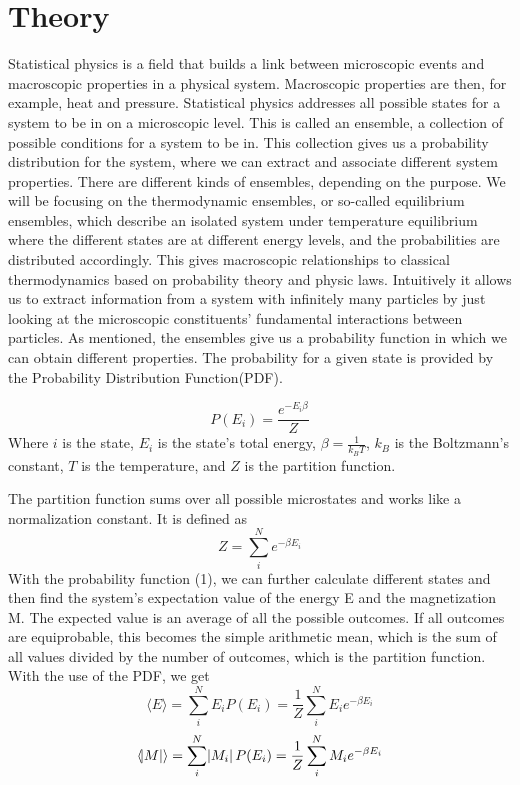 \documentclass{article}
\begin{document}
\newpage
\section{Theory}

Statistical physics is a field that builds a link between microscopic events and macroscopic properties in a physical system. Macroscopic properties are then, for example, heat and pressure.  Statistical physics addresses all possible states for a system to be in on a microscopic level. This is called an ensemble, a collection of possible conditions for a system to be in. This collection gives us a probability distribution for the system, where we can extract and associate different system properties. There are different kinds of ensembles, depending on the purpose.  We will be focusing on the thermodynamic ensembles, or so-called equilibrium ensembles, which describe an isolated system under temperature equilibrium where the different states are at different energy levels, and the probabilities are distributed accordingly. \newline
This gives macroscopic relationships to classical thermodynamics based on probability theory and physic laws. Intuitively it allows us to extract information from a system with infinitely many particles by just looking at the microscopic constituents' fundamental interactions between particles.  As mentioned, the ensembles give us a probability function in which we can obtain different properties. The probability for a given state is provided by the Probability Distribution Function(PDF).

\begin{equation}
    P(E_{i}) = \frac{e^{-E_i\beta}}{Z}
\end{equation}
Where $i$ is the state, $E_i$ is the state's total energy, $\beta=\frac{1}{k_BT}$, $k_B$ is the Boltzmann's constant, $T$ is the temperature, and $Z$ is the partition function.

\noindent The partition function sums over all possible microstates and works like a normalization constant. It is defined as
\begin{equation}
    Z=\sum_{i}^{N}e^{-\beta E_i}
\end{equation}
With the probability function (1), we can further calculate different states and then find the system's expectation value of the energy E and the magnetization M. The expected value is an average of all the possible outcomes. If all outcomes are equiprobable, this becomes the simple arithmetic mean, which is the sum of all values divided by the number of outcomes, which is the partition function. With the use of the PDF, we get 
\begin{equation}
    \langle E\rangle = \sum_{i}^NE_{i}P(E_{i}) = \frac{1}{Z}\sum_{i}^NE_{i}e^{-\beta E_{i}}
\end{equation}
\begin{equation}
   \langle \abs{M} \rangle = \sum_{i}^N\abs{M_{i}}P(E_{i}) = \frac{1}{Z}\sum_{i}^NM_{i}e^{-\beta E_{i}}
\end{equation}
\newline \newline
\end{document}

